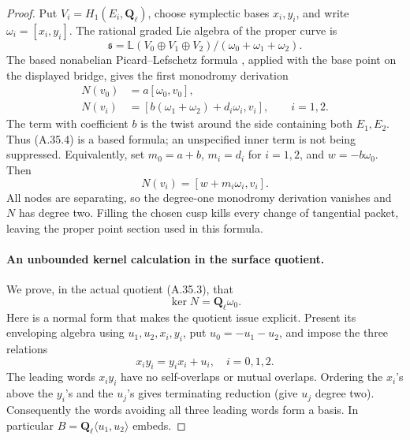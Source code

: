 \begin{proof}
Put \(V_i=H_1(E_i,\mathbf Q_\ell)\), choose symplectic bases
\(x_i,y_i\), and write \(\omega_i=[x_i,y_i]\).
The rational graded Lie algebra of the proper curve is
\[
 \mathfrak s=
 \mathbb L(V_0\oplus V_1\oplus V_2)/
                  (\omega_0+\omega_1+\omega_2).
                                                        \tag{A.35.3}
\]
The based nonabelian Picard--Lefschetz formula
\cite[Definition 3.1.5 and Theorem 3.1.6]{fghBettsDogra},
applied with the base point on the displayed bridge, gives
the first monodromy derivation
\[
 \begin{split}
 N(v_0)&=a[\omega_0,v_0],\\
 N(v_i)&=[b(\omega_1+\omega_2)+d_i\omega_i,v_i],
                                      \qquad i=1,2.
 \end{split}                                             \tag{A.35.4}
\]
The term with coefficient \(b\) is the twist around the side
containing both \(E_1,E_2\). Thus (A.35.4) is a based formula;
an unspecified inner term is not being suppressed.
Equivalently, set \(m_0=a+b\), \(m_i=d_i\) for \(i=1,2\),
and \(w=-b\omega_0\). Then
\[
       N(v_i)=[w+m_i\omega_i,v_i].
                                                        \tag{A.35.5}
\]
All nodes are separating, so the degree-one monodromy
derivation vanishes and \(N\) has degree two. Filling the
chosen cusp kills every change of tangential packet, leaving
the proper point section used in this formula.

\paragraph{An unbounded kernel calculation in the surface quotient.}
We prove, in the actual quotient (A.35.3), that
\[
                    \ker N=\mathbf Q_\ell\omega_0.
                                                        \tag{A.35.6}
\]
Here is a normal form that makes the quotient issue explicit.
Present its enveloping algebra using \(u_1,u_2,x_i,y_i\),
put \(u_0=-u_1-u_2\), and impose the three relations
\[
                    x_i y_i=y_i x_i+u_i,\quad i=0,1,2.
                                                        \tag{A.35.7}
\]
The leading words \(x_i y_i\) have no self-overlaps or mutual
overlaps. Ordering the \(x_i\)'s above the \(y_i\)'s and the
\(u_j\)'s gives terminating reduction (give \(u_j\) degree two).
Consequently the words avoiding all three leading words
form a basis. In particular
\(B=\mathbf Q_\ell\langle u_1,u_2\rangle\) embeds.


\end{proof}
